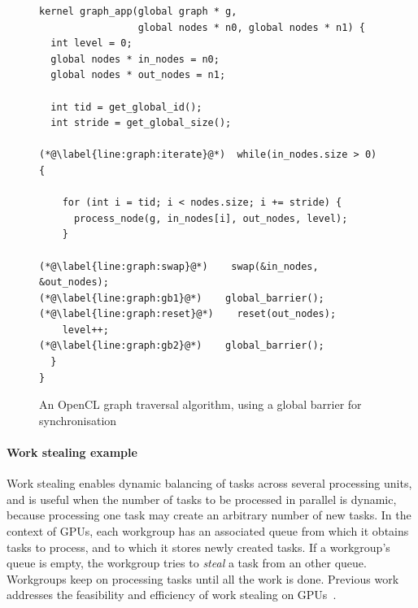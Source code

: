 \documentclass[numbers,nocopyrightspace,10pt]{sigplanconf}
\begin{document}
\begin{figure}

\begin{lstlisting}
kernel graph_app(global graph * g, 
                 global nodes * n0, global nodes * n1) {
  int level = 0;
  global nodes * in_nodes = n0;
  global nodes * out_nodes = n1;

  int tid = get_global_id();
  int stride = get_global_size();

(*@\label{line:graph:iterate}@*)  while(in_nodes.size > 0) {

    for (int i = tid; i < nodes.size; i += stride) {
      process_node(g, in_nodes[i], out_nodes, level);
    }

(*@\label{line:graph:swap}@*)    swap(&in_nodes, &out_nodes);
(*@\label{line:graph:gb1}@*)    global_barrier();
(*@\label{line:graph:reset}@*)    reset(out_nodes);
    level++;
(*@\label{line:graph:gb2}@*)    global_barrier();
  }
}
\end{lstlisting}
\caption{An OpenCL graph traversal algorithm, using a global barrier for synchronisation}\label{fig:graphsearch}
\end{figure}

\paragraph{Work stealing example}
%
Work stealing enables dynamic balancing of tasks across several
processing units, and is useful when the number of tasks to be
processed in parallel is dynamic, because processing
one task may create an arbitrary number of new tasks.  In the context
of GPUs, each workgroup has an associated queue from which it
obtains tasks to process, and to which it stores newly created
tasks. If a workgroup's queue is empty, the workgroup tries to \emph{steal} a task from an other
queue. Workgroups keep on processing tasks until all the work is
done. Previous work addresses the feasibility and efficiency of work
stealing on GPUs~\cite{dlb-web,TPO10}.
\end{document}
